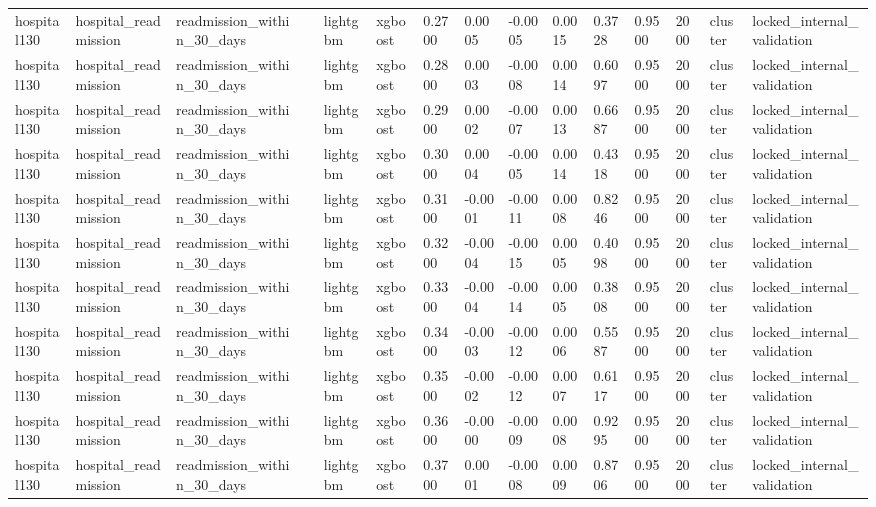 \begin{tabular}{lllllllllllllll}
hospital130 & hospital\_readmission & readmission\_within\_30\_days &  & lightgbm & xgboost & 0.2700 & 0.0005 & -0.0005 & 0.0015 & 0.3728 & 0.9500 & 2000 & cluster & locked\_internal\_validation \\
hospital130 & hospital\_readmission & readmission\_within\_30\_days &  & lightgbm & xgboost & 0.2800 & 0.0003 & -0.0008 & 0.0014 & 0.6097 & 0.9500 & 2000 & cluster & locked\_internal\_validation \\
hospital130 & hospital\_readmission & readmission\_within\_30\_days &  & lightgbm & xgboost & 0.2900 & 0.0002 & -0.0007 & 0.0013 & 0.6687 & 0.9500 & 2000 & cluster & locked\_internal\_validation \\
hospital130 & hospital\_readmission & readmission\_within\_30\_days &  & lightgbm & xgboost & 0.3000 & 0.0004 & -0.0005 & 0.0014 & 0.4318 & 0.9500 & 2000 & cluster & locked\_internal\_validation \\
hospital130 & hospital\_readmission & readmission\_within\_30\_days &  & lightgbm & xgboost & 0.3100 & -0.0001 & -0.0011 & 0.0008 & 0.8246 & 0.9500 & 2000 & cluster & locked\_internal\_validation \\
hospital130 & hospital\_readmission & readmission\_within\_30\_days &  & lightgbm & xgboost & 0.3200 & -0.0004 & -0.0015 & 0.0005 & 0.4098 & 0.9500 & 2000 & cluster & locked\_internal\_validation \\
hospital130 & hospital\_readmission & readmission\_within\_30\_days &  & lightgbm & xgboost & 0.3300 & -0.0004 & -0.0014 & 0.0005 & 0.3808 & 0.9500 & 2000 & cluster & locked\_internal\_validation \\
hospital130 & hospital\_readmission & readmission\_within\_30\_days &  & lightgbm & xgboost & 0.3400 & -0.0003 & -0.0012 & 0.0006 & 0.5587 & 0.9500 & 2000 & cluster & locked\_internal\_validation \\
hospital130 & hospital\_readmission & readmission\_within\_30\_days &  & lightgbm & xgboost & 0.3500 & -0.0002 & -0.0012 & 0.0007 & 0.6117 & 0.9500 & 2000 & cluster & locked\_internal\_validation \\
hospital130 & hospital\_readmission & readmission\_within\_30\_days &  & lightgbm & xgboost & 0.3600 & -0.0000 & -0.0009 & 0.0008 & 0.9295 & 0.9500 & 2000 & cluster & locked\_internal\_validation \\
hospital130 & hospital\_readmission & readmission\_within\_30\_days &  & lightgbm & xgboost & 0.3700 & 0.0001 & -0.0008 & 0.0009 & 0.8706 & 0.9500 & 2000 & cluster & locked\_internal\_validation \\

\end{tabular}
